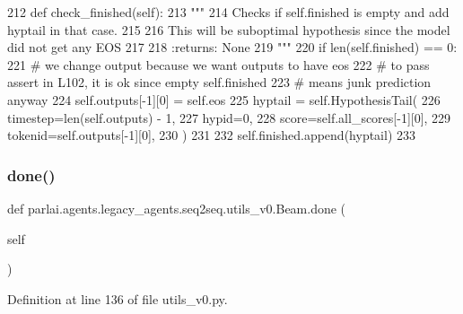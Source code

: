 \begin{DoxyCode}
212     \textcolor{keyword}{def }check\_finished(self):
213         \textcolor{stringliteral}{"""}
214 \textcolor{stringliteral}{        Checks if self.finished is empty and add hyptail in that case.}
215 \textcolor{stringliteral}{}
216 \textcolor{stringliteral}{        This will be suboptimal hypothesis since the model did not get any EOS}
217 \textcolor{stringliteral}{}
218 \textcolor{stringliteral}{        :returns: None}
219 \textcolor{stringliteral}{        """}
220         \textcolor{keywordflow}{if} len(self.finished) == 0:
221             \textcolor{comment}{# we change output because we want outputs to have eos}
222             \textcolor{comment}{# to pass assert in L102, it is ok since empty self.finished}
223             \textcolor{comment}{# means junk prediction anyway}
224             self.outputs[-1][0] = self.eos
225             hyptail = self.HypothesisTail(
226                 timestep=len(self.outputs) - 1,
227                 hypid=0,
228                 score=self.all\_scores[-1][0],
229                 tokenid=self.outputs[-1][0],
230             )
231 
232             self.finished.append(hyptail)
233 
\end{DoxyCode}
\mbox{\label{classparlai_1_1agents_1_1legacy__agents_1_1seq2seq_1_1utils__v0_1_1Beam_ac37b26314438d9e94b03e5a45efaf5dd}} 
\subsubsection{\texorpdfstring{done()}{done()}}
{\footnotesize\ttfamily def parlai.\+agents.\+legacy\+\_\+agents.\+seq2seq.\+utils\+\_\+v0.\+Beam.\+done (\begin{DoxyParamCaption}\item[{}]{self }\end{DoxyParamCaption})}



Definition at line 136 of file utils\+\_\+v0.\+py.


